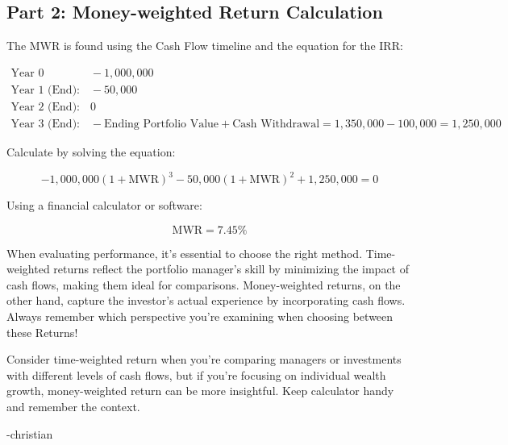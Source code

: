 \subsection*{Part 2: Money-weighted Return Calculation}

The MWR is found using the Cash Flow timeline and the equation for the IRR:

\[
\begin{align*}
\text{Year 0 (Initial Investment):} &\ -1,000,000 \\
\text{Year 1 (End)}: &\ -50,000 \\
\text{Year 2 (End)}: &\ 0 \\
\text{Year 3 (End)}: &\ -\text{Ending Portfolio Value} + \text{Cash Withdrawal} = 1,350,000 - 100,000 = 1,250,000 
\end{align*}
\]

Calculate  by solving the equation:

\[
-1,000,000 (1+\text{MWR})^3 - 50,000 (1+\text{MWR})^2 + 1,250,000 = 0 
\]

Using a financial calculator or software:

\[
\text{MWR} = 7.45\%
\]

\begin{infobox}

When evaluating performance, it's essential to choose the right method. Time-weighted returns reflect the portfolio manager's skill by minimizing the impact of cash flows, making them ideal for comparisons. Money-weighted returns, on the other hand, capture the investor's actual experience by incorporating cash flows. Always remember which perspective you're examining when choosing between these Returns! 

Consider time-weighted return when you're comparing managers or investments with different levels of cash flows, but if you're focusing on individual wealth growth, money-weighted return can be more insightful. Keep calculator handy and remember the context.

-christian

\end{infobox}